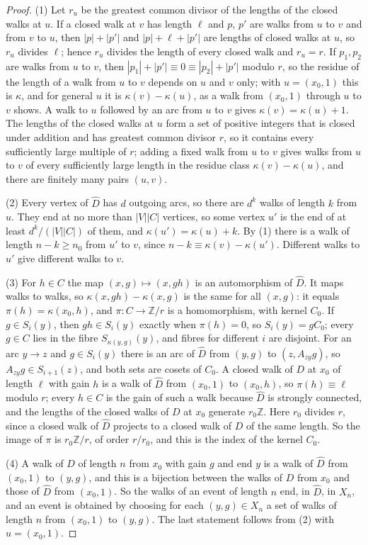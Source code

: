 \begin{proof}
(1) Let $r_u$ be the greatest common divisor of the lengths of the closed walks at $u$. If a closed walk at $v$ has length $\ell$ and $p$, $p'$ are walks from $u$ to $v$ and from $v$ to $u$, then $|p|+|p'|$ and $|p|+\ell+|p'|$ are lengths of closed walks at $u$, so $r_u$ divides $\ell$; hence $r_u$ divides the length of every closed walk and $r_u=r$. If $p_1,p_2$ are walks from $u$ to $v$, then $|p_1|+|p'|\equiv0\equiv|p_2|+|p'|$ modulo $r$, so the residue of the length of a walk from $u$ to $v$ depends on $u$ and $v$ only; with $u=(x_0,1)$ this is $\kappa$, and for general $u$ it is $\kappa(v)-\kappa(u)$, as a walk from $(x_0,1)$ through $u$ to $v$ shows. A walk to $u$ followed by an arc from $u$ to $v$ gives $\kappa(v)=\kappa(u)+1$. The lengths of the closed walks at $u$ form a set of positive integers that is closed under addition and has greatest common divisor $r$, so it contains every sufficiently large multiple of $r$; adding a fixed walk from $u$ to $v$ gives walks from $u$ to $v$ of every sufficiently large length in the residue class $\kappa(v)-\kappa(u)$, and there are finitely many pairs $(u,v)$.

(2) Every vertex of $\hat D$ has $d$ outgoing arcs, so there are $d^k$ walks of length $k$ from $u$. They end at no more than $|V||C|$ vertices, so some vertex $u'$ is the end of at least $d^k/(|V||C|)$ of them, and $\kappa(u')=\kappa(u)+k$. By (1) there is a walk of length $n-k\ge n_0$ from $u'$ to $v$, since $n-k\equiv\kappa(v)-\kappa(u')$. Different walks to $u'$ give different walks to $v$.

(3) For $h\in C$ the map $(x,g)\mapsto(x,gh)$ is an automorphism of $\hat D$. It maps walks to walks, so $\kappa(x,gh)-\kappa(x,g)$ is the same for all $(x,g)$: it equals $\pi(h)=\kappa(x_0,h)$, and $\pi\colon C\to\mathbb{Z}/r$ is a homomorphism, with kernel $C_0$. If $g\in S_i(y)$, then $gh\in S_i(y)$ exactly when $\pi(h)=0$, so $S_i(y)=gC_0$; every $g\in C$ lies in the fibre $S_{\kappa(y,g)}(y)$, and fibres for different $i$ are disjoint. For an arc $y\to z$ and $g\in S_i(y)$ there is an arc of $\hat D$ from $(y,g)$ to $(z,A_{zy}g)$, so $A_{zy}g\in S_{i+1}(z)$, and both sets are cosets of $C_0$. A closed walk of $D$ at $x_0$ of length $\ell$ with gain $h$ is a walk of $\hat D$ from $(x_0,1)$ to $(x_0,h)$, so $\pi(h)\equiv\ell$ modulo $r$; every $h\in C$ is the gain of such a walk because $\hat D$ is strongly connected, and the lengths of the closed walks of $D$ at $x_0$ generate $r_0\mathbb{Z}$. Here $r_0$ divides $r$, since a closed walk of $\hat D$ projects to a closed walk of $D$ of the same length. So the image of $\pi$ is $r_0\mathbb{Z}/r$, of order $r/r_0$, and this is the index of the kernel $C_0$.

(4) A walk of $D$ of length $n$ from $x_0$ with gain $g$ and end $y$ is a walk of $\hat D$ from $(x_0,1)$ to $(y,g)$, and this is a bijection between the walks of $D$ from $x_0$ and those of $\hat D$ from $(x_0,1)$. So the walks of an event of length $n$ end, in $\hat D$, in $X_n$, and an event is obtained by choosing for each $(y,g)\in X_n$ a set of walks of length $n$ from $(x_0,1)$ to $(y,g)$. The last statement follows from (2) with $u=(x_0,1)$.
\end{proof}

